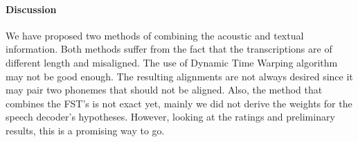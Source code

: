 \paragraph{Discussion}
We have proposed two methods of combining the acoustic and textual information.
Both methods suffer from the fact that the transcriptions are of different length and misaligned.
The use of Dynamic Time Warping algorithm may not be good enough.
The resulting alignments are not always desired since it may pair two phonemes that should not be aligned.
Also, the method that combines the FST's is not exact yet, mainly we did not derive the weights for the speech decoder's hypotheses.
However, looking at the ratings and preliminary results, this is a promising way to go.